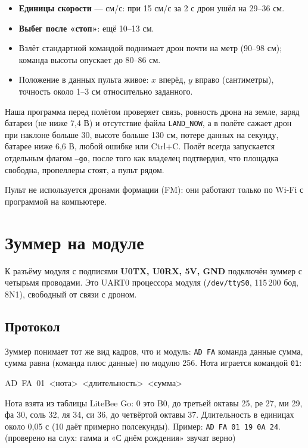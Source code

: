 \begin{itemize}
  \item \textbf{Единицы скорости} --- см/с: при 15 см/с за 2 с дрон ушёл на 29--36 см. \pr{}
  \item \textbf{Выбег после «стоп»}: ещё 10--13 см. \pr{}
  \item Взлёт стандартной командой поднимает дрон почти на метр (90--98 см); команда высоты опускает до 80--86 см. \pr{}
  \item Положение в данных пульта живое: $x$ вперёд, $y$ вправо (сантиметры), точность около 1--3 см относительно заданного. \pr{}
\end{itemize}

\begin{opasno}
Наша программа перед полётом проверяет связь, ровность дрона на земле, заряд батареи (не ниже 7,4 В) и отсутствие файла \texttt{LAND\_NOW}, а в полёте сажает дрон при наклоне больше 30\textdegree, высоте больше 130 см, потере данных на секунду, батарее ниже 6,6 В, любой ошибке или Ctrl+C. Полёт всегда запускается отдельным флагом \texttt{--go}, после того как владелец подтвердил, что площадка свободна, пропеллеры стоят, а пульт рядом.
\end{opasno}

Пульт не используется дронами формации (FM): они работают только по Wi-Fi с программой на компьютере. \vyv{}

\section{Зуммер на модуле}

К разъёму модуля с подписями \textbf{U0TX, U0RX, 5V, GND} подключён зуммер с четырьмя проводами. Это UART0 процессора модуля (\texttt{/dev/ttyS0}, 115\,200 бод, 8N1), свободный от связи с дроном. \pr{}

\subsection*{Протокол}

Зуммер понимает тот же вид кадров, что и модуль: \texttt{AD FA} команда данные сумма, сумма равна (команда плюс данные) по модулю 256. Нота играется командой \texttt{01}:

\begin{center}\ttfamily AD\ FA\ 01\ <нота>\ <длительность>\ <сумма>\end{center}

Нота взята из таблицы LiteBee Go: 0 это B0, до третьей октавы 25, ре 27, ми 29, фа 30, соль 32, ля 34, си 36, до четвёртой октавы 37. Длительность в единицах около 0,05 с (10 даёт примерно полсекунды). Пример: \texttt{AD FA 01 19 0A 24}. \pr{} (проверено на слух: гамма и «С днём рождения» звучат верно)

